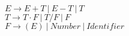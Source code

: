 \begin{center}
    $ E \rightarrow E + T \ | \  E - T \ | \ T$ \\
    $ T \rightarrow T \cdot F \ | \ T / F \ | \ F$ \\
    $ F \rightarrow (E) \ |\  Number \ | \ Identifier$
\end{center}